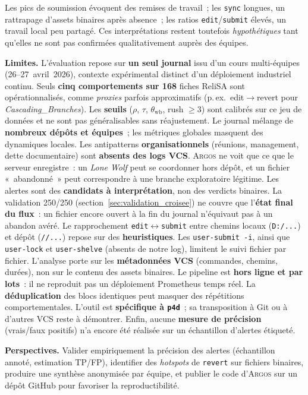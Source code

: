 \documentclass[conference]{IEEEtran}
\newcommand{\toolname}{\textsc{Argos}}
\begin{document}
Les pics de soumission évoquent des remises de travail~; les
\texttt{sync} longues, un rattrapage d'assets binaires après absence~;
les ratios \texttt{edit}/\texttt{submit} élevés, un travail local peu
partagé. Ces interprétations restent toutefois \emph{hypothétiques} tant
qu'elles ne sont pas confirmées qualitativement auprès des équipes.

\textbf{Limites.}
L'évaluation repose sur \textbf{un seul journal} issu d'un cours
multi-équipes (26--27~avril~2026), contexte expérimental distinct d'un
déploiement industriel continu. Seuls \textbf{cinq comportements sur 168}
fiches ReliSA sont opérationnalisés, comme \emph{proxies} parfois
approximatifs (p.\,ex.\ edit$\rightarrow$revert pour
\emph{Cascading\_Branches}). Les \textbf{seuils} ($\rho$, $\tau$,
$\theta_{\mathrm{wb}}$, rush $\geq 3$) sont calibrés sur ce jeu de
données et ne sont pas généralisables sans réajustement. Le journal
mélange de \textbf{nombreux dépôts et équipes}~; les métriques globales
masquent des dynamiques locales. Les antipatterns \textbf{organisationnels}
(réunions, management, dette documentaire) sont \textbf{absents des
logs VCS}. \toolname{} ne voit que ce que le serveur enregistre~: un
\emph{Lone Wolf} peut se coordonner hors dépôt, et un fichier «~abandonné~»
peut correspondre à une branche exploratoire légitime. Les alertes sont
des \textbf{candidats à interprétation}, non des verdicts binaires.
La validation 250/250 (section~\ref{sec:validation_croisee}) ne couvre que
l'\textbf{état final du flux}~: un fichier encore ouvert à la fin du
journal n'équivaut pas à un abandon avéré. Le rapprochement
\texttt{edit}$\leftrightarrow$\texttt{submit} entre chemins locaux
(\texttt{D:/...}) et dépôt (\texttt{//...}) repose sur des
\textbf{heuristiques}. Les \texttt{user-submit -i}, ainsi que
\texttt{user-lock} et \texttt{user-shelve} (absents de notre log),
limitent le suivi fichier par fichier. L'analyse porte sur les
\textbf{métadonnées VCS} (commandes, chemins, durées), non sur le contenu
des assets binaires. Le pipeline est \textbf{hors ligne et par lots}~: il
ne reproduit pas un déploiement Prometheus temps réel. La
\textbf{déduplication} des blocs identiques peut masquer des répétitions
comportementales. L'outil est \textbf{spécifique à \texttt{p4d}}~; sa
transposition à Git ou à d'autres VCS reste à démontrer. Enfin, aucune
\textbf{mesure de précision} (vrais/faux positifs) n'a encore été
réalisée sur un échantillon d'alertes étiqueté.

\textbf{Perspectives.}
Valider empiriquement la précision des alertes (échantillon annoté,
estimation TP/FP), identifier des \emph{hotspots} de \texttt{revert} sur
fichiers binaires, produire une synthèse anonymisée par équipe, et
publier le code d'\toolname{} sur un dépôt GitHub pour favoriser la
reproductibilité.



\end{document}
